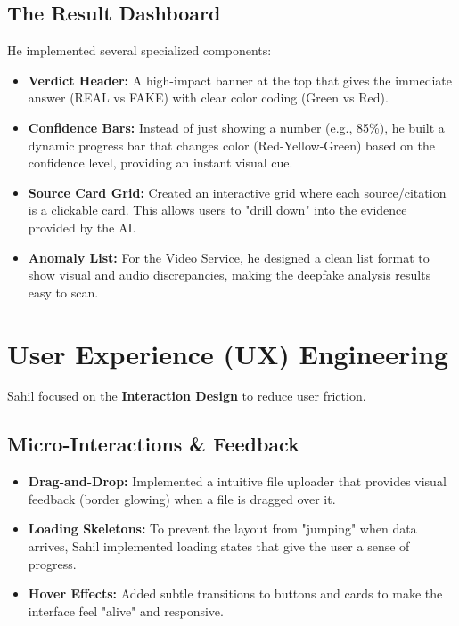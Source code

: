 \documentclass[12pt]{article}
\begin{document}
\subsection{The Result Dashboard}
He implemented several specialized components:
\begin{itemize}
    \item \textbf{Verdict Header:} A high-impact banner at the top that gives the immediate answer (REAL vs FAKE) with clear color coding (Green vs Red).
    \item \textbf{Confidence Bars:} Instead of just showing a number (e.g., 85\%), he built a dynamic progress bar that changes color (Red-Yellow-Green) based on the confidence level, providing an instant visual cue.
    \item \textbf{Source Card Grid:} Created an interactive grid where each source/citation is a clickable card. This allows users to "drill down" into the evidence provided by the AI.
    \item \textbf{Anomaly List:} For the Video Service, he designed a clean list format to show visual and audio discrepancies, making the deepfake analysis results easy to scan.
\end{itemize}

\section{User Experience (UX) Engineering}
Sahil focused on the \textbf{Interaction Design} to reduce user friction.

\subsection{Micro-Interactions & Feedback}
\begin{itemize}
    \item \textbf{Drag-and-Drop:} Implemented a intuitive file uploader that provides visual feedback (border glowing) when a file is dragged over it.
    \item \textbf{Loading Skeletons:} To prevent the layout from "jumping" when data arrives, Sahil implemented loading states that give the user a sense of progress.
    \item \textbf{Hover Effects:} Added subtle transitions to buttons and cards to make the interface feel "alive" and responsive.
\end{itemize}
\end{document}
